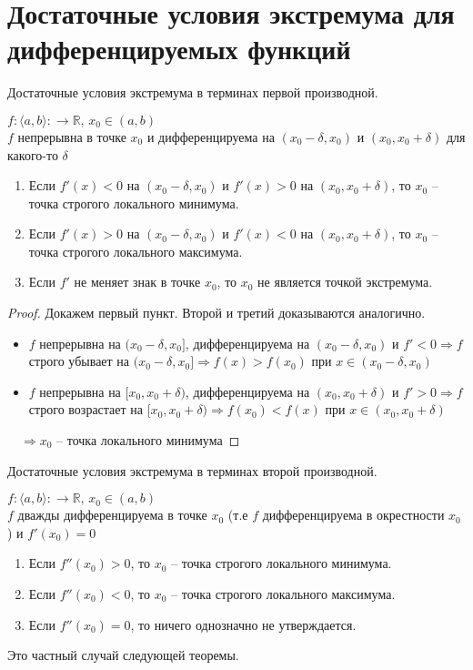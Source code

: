 \section{Достаточные условия экстремума для дифференцируемых функций \href{https://youtu.be/CAxh8kYEOlQ?t=1258}{\Walley}}
\begin{theorem-non}
    Достаточные условия экстремума в терминах первой производной.

    $f: \langle a, b \rangle: \to \mathbb{R}, \, x_0 \in (a, b)$ \\
    $f$ непрерывна в точке $x_0$ и дифференцируема на $(x_0 - \delta, x_0)$ и $(x_0, x_0 + \delta)$ для какого-то $\delta$
    \begin{enumerate}
        \item Если $f'(x) < 0$ на $(x_0 - \delta, x_0)$ и $f'(x) > 0$ на $(x_0, x_0 + \delta)$, то $x_0$ -- точка строгого локального минимума.
        \item Если $f'(x) > 0$ на $(x_0 - \delta, x_0)$ и $f'(x) < 0$ на $(x_0, x_0 + \delta)$, то $x_0$ -- точка строгого локального максимума.
        \item Если $f'$ не меняет знак в точке $x_0$, то $x_0$ не является точкой экстремума. 
    \end{enumerate}
\end{theorem-non}

\begin{proof}
    Докажем первый пункт. Второй и третий доказываются аналогично.
    \begin{itemize}
        \item $f$ непрерывна на $(x_0 - \delta, x_0]$, дифференцируема на $(x_0 - \delta, x_0)$ и $f' < 0 \Rightarrow f$ строго убывает на $(x_0 - \delta, x_0] \Rightarrow f(x) > f(x_0)$ при $x \in (x_0 - \delta, x_0)$
        \item  $f$ непрерывна на $[x_0, x_0 + \delta)$, дифференцируема на $(x_0, x_0 + \delta)$ и $f' > 0 \Rightarrow f$ строго возрастает на $[x_0, x_0 + \delta) \Rightarrow f(x_0) < f(x)$ при $x \in (x_0, x_0 + \delta)$
    \end{itemize}
    $\quad \Rightarrow x_0$ -- точка локального минимума
\end{proof}

\begin{theorem-non}
    Достаточные условия экстремума в терминах второй производной.

    $f: \langle a, b \rangle: \to \mathbb{R}, \, x_0 \in (a, b)$ \\
    $f$ дважды дифференцируема в точке $x_0$ (т.е $f$ дифференцируема в окрестности $x_0$) и $f'(x_0) = 0$
    \begin{enumerate}
        \item Если $f''(x_0) > 0$, то $x_0$ -- точка строгого локального минимума.
        \item Если $f''(x_0) < 0$, то $x_0$ -- точка строгого локального максимума.
        \item Если $f''(x_0) = 0$, то ничего однозначно не утверждается.
    \end{enumerate}

    Это частный случай следующей теоремы.
\end{theorem-non}

